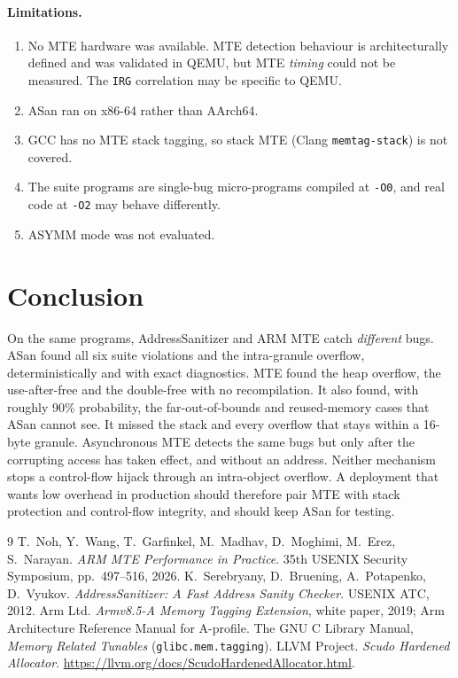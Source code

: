 \documentclass[11pt,a4paper]{article}
\begin{document}
\paragraph{Limitations.}
\begin{enumerate}[itemsep=1pt]
\item No MTE hardware was available.
MTE detection behaviour is architecturally defined and was validated in QEMU, but MTE \emph{timing} could not be measured.
The \texttt{IRG} correlation may be specific to QEMU.
\item ASan ran on x86-64 rather than AArch64.
\item GCC has no MTE stack tagging, so stack MTE (Clang \texttt{memtag-stack}) is not covered.
\item The suite programs are single-bug micro-programs compiled at \texttt{-O0}, and real code at \texttt{-O2} may behave differently.
\item ASYMM mode was not evaluated.
\end{enumerate}

\section{Conclusion}
On the same programs, AddressSanitizer and ARM MTE catch \emph{different} bugs.
ASan found all six suite violations and the intra-granule overflow, deterministically and with exact diagnostics.
MTE found the heap overflow, the use-after-free and the double-free with no recompilation.
It also found, with roughly 90\% probability, the far-out-of-bounds and reused-memory cases that ASan cannot see.
It missed the stack and every overflow that stays within a 16-byte granule.
Asynchronous MTE detects the same bugs but only after the corrupting access has taken effect, and without an address.
Neither mechanism stops a control-flow hijack through an intra-object overflow.
A deployment that wants low overhead in production should therefore pair MTE with stack protection and control-flow integrity, and should keep ASan for testing.

\begin{thebibliography}{9}\small
{} T.~Noh, Y.~Wang, T.~Garfinkel, M.~Madhav, D.~Moghimi, M.~Erez, S.~Narayan. \emph{ARM MTE Performance in Practice}. 35th USENIX Security Symposium, pp.~497--516, 2026.
 K.~Serebryany, D.~Bruening, A.~Potapenko, D.~Vyukov. \emph{AddressSanitizer: A Fast Address Sanity Checker}. USENIX ATC, 2012.
 Arm Ltd. \emph{Armv8.5-A Memory Tagging Extension}, white paper, 2019; Arm Architecture Reference Manual for A-profile.
 The GNU C Library Manual, \emph{Memory Related Tunables} (\texttt{glibc.mem.tagging}).
 LLVM Project. \emph{Scudo Hardened Allocator}. \url{https://llvm.org/docs/ScudoHardenedAllocator.html}.
\end{thebibliography}
\end{document}
